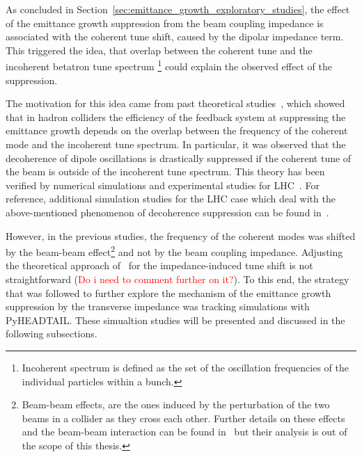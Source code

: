 As concluded in Section~\ref{sec:emittance_growth_exploratory_studies}, the effect of the emittance growth suppression from the beam coupling impedance is associated with the coherent tune shift, caused by the dipolar impedance term. This triggered the idea, that overlap between the coherent tune and the incoherent betatron tune spectrum \footnote{Incoherent spectrum is defined as the set of the oscillation frequencies of the individual particles within a bunch.} could explain the observed effect of the suppression. 

The motivation for this idea came from past theoretical studies~\cite{Alexahin:314169, Alexahin:485304}, which showed that in hadron colliders the efficiency of the feedback system at suppressing the emittance growth depends on the overlap between the frequency of the coherent mode and the incoherent tune spectrum. In particular, it was observed that the decoherence of dipole oscillations is drastically suppressed if the coherent tune of the beam is outside of the incoherent tune spectrum. This theory has been verified by numerical simulations and experimental studies for LHC~\cite{QIANG201853, PhysRevAccelBeams.23.021002, PhysRevAccelBeams.24.011003}. %
For reference, additional simulation studies for the LHC case which deal with the above-mentioned phenomenon of decoherence suppression can be found in~\cite{Alexahin:497415, Herr:486007}. 

However, in the previous studies, the frequency of the coherent modes was shifted by the beam-beam effect\footnote{Beam-beam effects, are the ones induced by the perturbation of the two beams in a collider as they cross each other. Further details on these effects and the beam-beam interaction can be found in~\cite{Herr:1982430} but their analysis is out of the scope of this thesis.} and not by the beam coupling impedance. Adjusting the theoretical approach of~\cite{Alexahin:314169} for the impedance-induced tune shift is not straightforward (\textcolor{red}{Do i need to comment further on it?}). To this end, the strategy that was followed to further explore the mechanism of the emittance growth suppression by the transverse impedance was tracking simulations with PyHEADTAIL. These simualtion studies will be presented and discussed in the following subsections.


